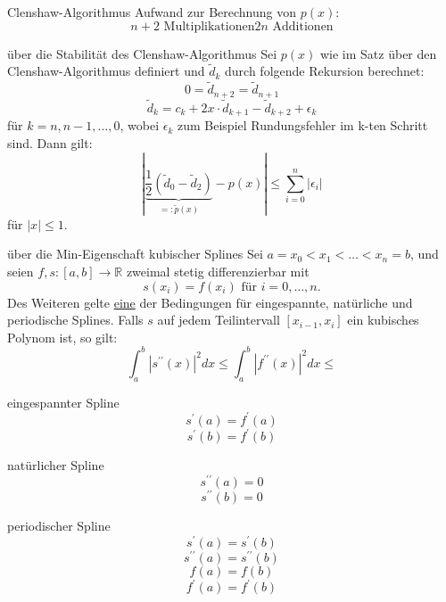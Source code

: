 \begin{flashcard}[Aufwand]{Clenshaw-Algorithmus}
Aufwand zur Berechnung von $p(x)$:
$$
	n+2 \text{ Multiplikationen}
	2n \text{ Additionen}
$$
\end{flashcard}

\begin{flashcard}[Satz]{über die Stabilität des Clenshaw-Algorithmus}
Sei $p(x)$ wie im Satz über den Clenshaw-Algorithmus definiert und $\tilde{d}_k$ durch folgende Rekursion berechnet:
$$
	0 = \tilde{d}_{n+2} = \tilde{d}_{n+1}
$$
$$
	\tilde{d}_k = c_k + 2x \cdot \tilde{d}_{k+1} - \tilde{d}_{k+2} + \epsilon_k
$$
für $k = n,n-1, \ldots , 0$, wobei $\epsilon_k$ zum Beispiel Rundungsfehler im k-ten Schritt sind. Dann gilt:
$$
	| \underbrace{\frac{1}{2}(\tilde{d}_0 - \tilde{d}_2)}_{=:\tilde{p}(x)} - p(x) | \leq \sum_{i=0}^n |\epsilon_i|
$$
für $|x| \leq 1$.
\end{flashcard}

\begin{flashcard}[Satz]{über die Min-Eigenschaft kubischer Splines}
Sei $a = x_0 < x_1 < \ldots < x_n = b$, und seien $f,s: [a,b] \rightarrow \mathbb{R}$ zweimal stetig differenzierbar mit
$$
	s(x_i) = f(x_i) \text{ für } i= 0, \ldots , n.
$$
Des Weiteren gelte \underline{eine} der Bedingungen für eingespannte, natürliche und periodische Splines.
Falls $s$ auf jedem Teilintervall $[x_{i-1}, x_i]$ ein kubisches Polynom ist, so gilt:
$$
	\int_a^b | s^{\prime\prime}(x) |^2dx \leq 	\int_a^b | f^{\prime\prime}(x) |^2dx \leq
$$
\end{flashcard}

\begin{flashcard}[Definition]{eingespannter Spline}
$$
	s^\prime(a) = f^\prime(a)
$$
$$
	s^\prime(b) = f^\prime(b)
$$
\end{flashcard}

\begin{flashcard}[Definition]{natürlicher Spline}
$$
	s^{\prime\prime}(a) = 0
$$
$$
	s^{\prime\prime}(b) = 0
$$
\end{flashcard}

\begin{flashcard}[Definition]{periodischer Spline}
$$
	s^{\prime}(a) = s^{\prime}(b)
$$
$$
	s^{\prime\prime}(a) = s^{\prime\prime}(b)
$$
$$
	f(a) = f(b)
$$
$$
	f^{\prime}(a) = f^{\prime}(b)
$$
\end{flashcard}
